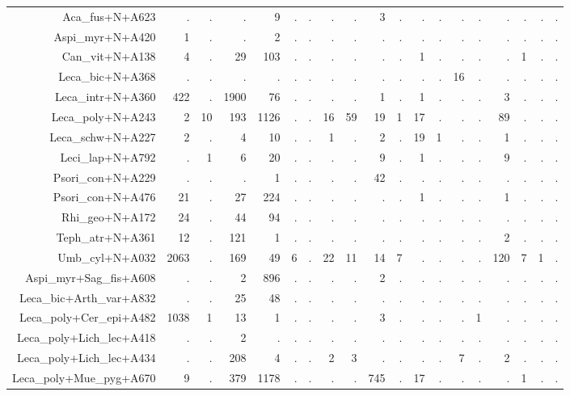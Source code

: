 \documentclass[a4paper, 11]{article}\usepackage[]{graphicx}\usepackage[]{color}
\begin{document}
\begin{table}
\begin{tabular}{rrrrrrrrrrrrrrrrrrr}
  \hline
Aca\_fus+N+A623 & . & . & . & 9 & . & . & . & . & 3 & . & . & . & . & . & . & . & . & . \\ 
  Aspi\_myr+N+A420 & 1 & . & . & 2 & . & . & . & . & . & . & . & . & . & . & . & . & . & . \\ 
  Can\_vit+N+A138 & 4 & . & 29 & 103 & . & . & . & . & . & . & 1 & . & . & . & . & 1 & . & . \\ 
  Leca\_bic+N+A368 & . & . & . & . & . & . & . & . & . & . & . & . & 16 & . & . & . & . & . \\ 
  Leca\_intr+N+A360 & 422 & . & 1900 & 76 & . & . & . & . & 1 & . & 1 & . & . & . & 3 & . & . & . \\ 
  Leca\_poly+N+A243 & 2 & 10 & 193 & 1126 & . & . & 16 & 59 & 19 & 1 & 17 & . & . & . & 89 & . & . & . \\ 
  Leca\_schw+N+A227 & 2 & . & 4 & 10 & . & . & 1 & . & 2 & . & 19 & 1 & . & . & 1 & . & . & . \\ 
  Leci\_lap+N+A792 & . & 1 & 6 & 20 & . & . & . & . & 9 & . & 1 & . & . & . & 9 & . & . & . \\ 
  Psori\_con+N+A229 & . & . & . & 1 & . & . & . & . & 42 & . & . & . & . & . & . & . & . & . \\ 
  Psori\_con+N+A476 & 21 & . & 27 & 224 & . & . & . & . & . & . & 1 & . & . & . & 1 & . & . & . \\ 
  Rhi\_geo+N+A172 & 24 & . & 44 & 94 & . & . & . & . & . & . & . & . & . & . & . & . & . & . \\ 
  Teph\_atr+N+A361 & 12 & . & 121 & 1 & . & . & . & . & . & . & . & . & . & . & 2 & . & . & . \\ 
  Umb\_cyl+N+A032 & 2063 & . & 169 & 49 & 6 & . & 22 & 11 & 14 & 7 & . & . & . & . & 120 & 7 & 1 & . \\ 
  Aspi\_myr+Sag\_fis+A608 & . & . & 2 & 896 & . & . & . & . & 2 & . & . & . & . & . & . & . & . & . \\ 
  Leca\_bic+Arth\_var+A832 & . & . & 25 & 48 & . & . & . & . & . & . & . & . & . & . & . & . & . & . \\ 
  Leca\_poly+Cer\_epi+A482 & 1038 & 1 & 13 & 1 & . & . & . & . & 3 & . & . & . & . & 1 & . & . & . & . \\ 
  Leca\_poly+Lich\_lec+A418 & . & . & 2 & . & . & . & . & . & . & . & . & . & . & . & . & . & . & . \\ 
  Leca\_poly+Lich\_lec+A434 & . & . & 208 & 4 & . & . & 2 & 3 & . & . & . & . & 7 & . & 2 & . & . & . \\ 
  Leca\_poly+Mue\_pyg+A670 & 9 & . & 379 & 1178 & . & . & . & . & 745 & . & 17 & . & . & . & . & 1 & . & . \\ 

\end{tabular}
\end{table}
\end{document}
